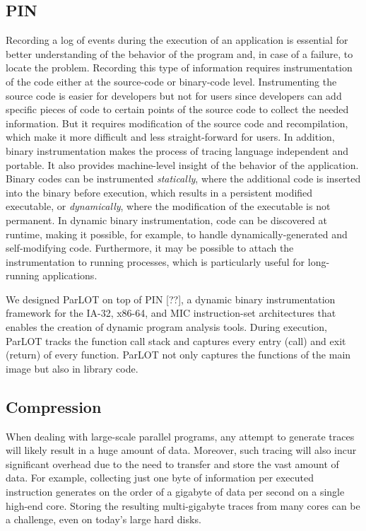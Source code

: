 
\subsection{PIN}
Recording a log of events during the execution of an application is essential for better understanding of the behavior of the program and, in case of a failure, to locate the problem. Recording this type of information requires instrumentation of the code either at the source-code or binary-code level. Instrumenting the source code is easier for developers but not for users since developers can add specific pieces of code to certain points of the source code to collect the needed information. But it requires modification of the source code and recompilation, which make it more difficult and less straight-forward for users. In addition, binary instrumentation makes the process of tracing language independent and portable. It also provides machine-level insight of the behavior of the application. Binary codes can be instrumented \textit{statically}, where the additional code is inserted into the binary before execution, which results in a persistent modified executable, or \textit{dynamically}, where the modification of the executable is not permanent. In dynamic binary instrumentation, code can be discovered at runtime, making it possible, for example, to handle dynamically-generated and self-modifying code. Furthermore, it may be possible to attach the instrumentation to running processes, which is particularly useful for long-running applications.

We designed ParLOT on top of PIN [??], a dynamic binary instrumentation framework for the IA-32, x86-64, and MIC instruction-set architectures that enables the creation of dynamic program analysis tools. During execution, ParLOT tracks the function call stack and captures every entry (call) and exit (return) of every function. ParLOT not only captures the functions of the main image but also in library code.


\subsection{Compression}
When dealing with large-scale parallel programs, any attempt to generate traces will likely result in a huge amount of data. Moreover, such tracing will also incur significant overhead due to the need to transfer and store the vast amount of data. For example, collecting just one byte of information per executed instruction generates on the order of a gigabyte of data per second on a single high-end core.  Storing the resulting multi-gigabyte traces from many cores can be a challenge, even on today's large hard disks.

